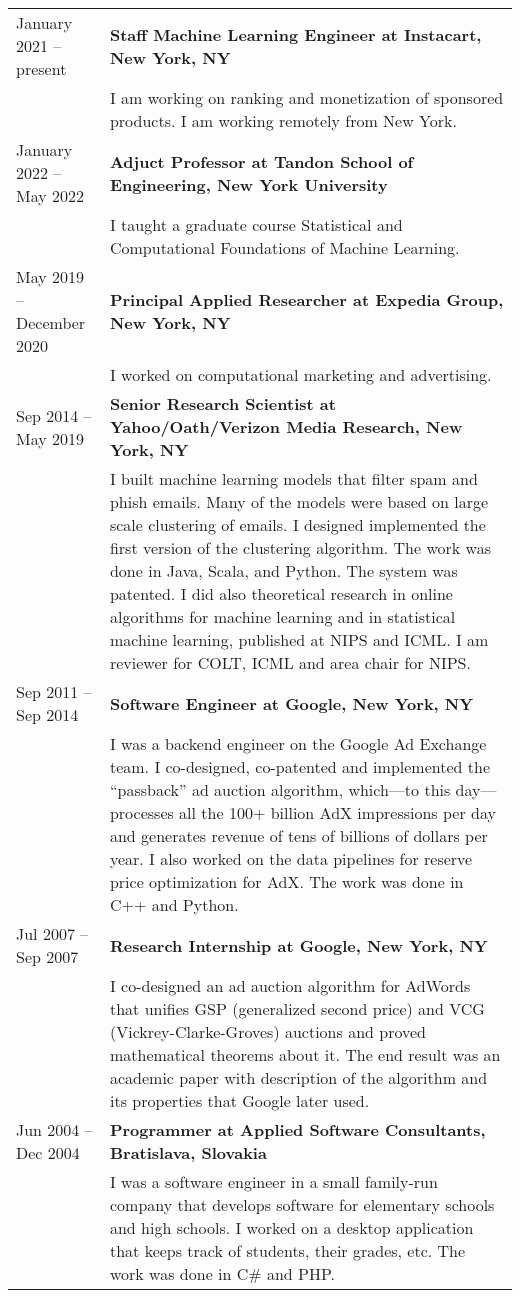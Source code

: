 \documentclass[9pt]{article}
\newcommand{\smallfont}{\small}
\begin{document}
\begin{longtable}{@{}lp{13cm}}
January 2021 -- present & \textbf{Staff Machine Learning Engineer at Instacart, New York, NY} \\
& {\smallfont I am working on ranking and monetization of sponsored products. I
am working remotely from New York.}
\\[0.3cm]
January 2022 -- May 2022 & \textbf{Adjuct Professor at Tandon School of Engineering, New York University} \\
& {\smallfont I taught a graduate course Statistical and Computational
Foundations of Machine Learning.}
\\[0.3cm]
May 2019 -- December 2020 & \textbf{Principal Applied Researcher at Expedia Group, New York, NY} \\
& {\smallfont I worked on computational marketing and advertising.}
\\[0.3cm]
Sep 2014 -- May 2019 & \textbf{Senior Research Scientist at Yahoo/Oath/Verizon Media Research, New York, NY} \\
& {\smallfont I built machine learning models that filter spam and phish emails.
Many of the models were based on large scale clustering of emails. I designed
implemented the first version of the clustering algorithm. The work was done in
Java, Scala, and Python. The system was patented. I did also theoretical
research in online algorithms for machine learning and in statistical machine
learning, published at NIPS and ICML. I am reviewer for COLT, ICML and area
chair for NIPS.}
\\[0.3cm]
Sep 2011 -- Sep 2014 & \textbf{Software Engineer at Google, New York, NY} \\
& {\smallfont I was a backend engineer on the Google Ad Exchange team. I
co-designed, co-patented and implemented the ``passback'' ad auction algorithm,
which---to this day---processes all the 100+ billion AdX impressions per day and
generates revenue of tens of billions of dollars per year. I also worked on the
data pipelines for reserve price optimization for AdX. The work was done in C++
and Python.}
\\[0.3cm]
Jul 2007 -- Sep 2007 & \textbf{Research Internship at Google, New York, NY} \\
& {\smallfont I co-designed an ad auction algorithm for AdWords that unifies GSP
(generalized second price) and VCG (Vickrey-Clarke-Groves) auctions and proved
mathematical theorems about it. The end result was an academic paper with description
of the algorithm and its properties that Google later used.}
\\[0.3cm]
Jun 2004 -- Dec 2004 & \textbf{Programmer at Applied Software Consultants, Bratislava, Slovakia} \\
& {\smallfont I was a software engineer in a small family-run company that
develops software for elementary schools and high schools. I worked on a desktop
application that keeps track of students, their grades, etc. The work was done in
C\# and PHP.}
\end{longtable}
\end{document}
